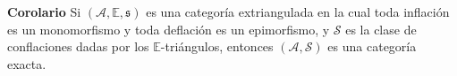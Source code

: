 \documentclass[preview]{standalone}
\begin{document}
\begin{center}
\justifying \textbf{Corolario} Si $(\mathscr{A}, \mathbb{E}, \mathfrak{s})$ es una categoría extriangulada en la cual toda inflación es un monomorfismo y toda deflación es un epimorfismo, y $\mathscr{S}$ es la clase de conflaciones dadas por los $\mathbb{E}$-triángulos, entonces $(\mathscr{A}, \mathscr{S})$ es una categoría exacta.
\end{center}
\end{document}

